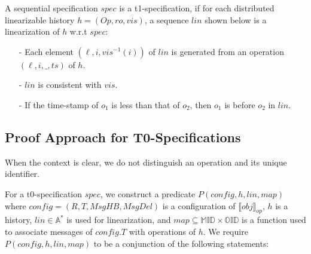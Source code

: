 \begin{definition}[t1-specification]
\label{definition:t1-specification}
A sequential specification $\mathit{spec}$ is a t1-specification, if for each distributed linearizable history $h=(\mathit{Op},\mathit{ro},\mathit{vis})$, a sequence $\mathit{lin}$ shown below is a linearization of $h$ w.r.t $\mathit{spec}$:

\begin{itemize}
\setlength{\itemsep}{0.5pt}
\item[-] Each element $(\ell,i,\mathit{vis}^{-1}(i))$ of $\mathit{lin}$ is generated from an operation $(\ell,i,\_,\mathit{ts})$ of $h$.

\item[-] $\mathit{lin}$ is consistent with $\mathit{vis}$.

\item[-] If the time-stamp of $o_1$ is less than that of $o_2$, then $o_1$ is before $o_2$ in $\mathit{lin}$.
\end{itemize}
\end{definition}








\subsection{Proof Approach for T0-Specifications}
\label{subsec:proof approach for t0-specifications}

When the context is clear, we do not distinguish an operation and its unique identifier.

For a t0-specification $\mathit{spec}$, we construct a predicate $P(\mathit{config},h,\mathit{lin},\mathit{map})$ where $\mathit{config} = (R,T,\mathit{MsgHB},\mathit{MsgDel})$ is a configuration of $\llbracket \mathit{obj} \rrbracket_{\mathit{op}}$, $h$ is a history, $\mathit{lin} \in \mathbb{A}^*$ is used for linearization, and $\mathit{map} \subseteq \mathbb{MID} \times \mathbb{OID}$ is a function used to associate messages of $\mathit{config}.T$ with operations of $h$. We require $P(\mathit{config},h,\mathit{lin},\mathit{map})$ to be a conjunction of the following statements:

